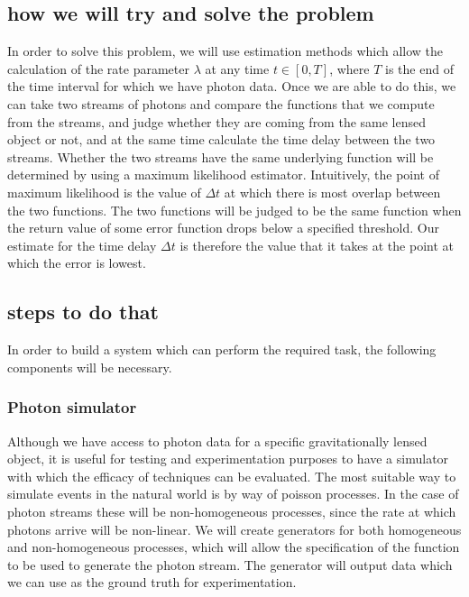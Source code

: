 \documentclass[11pt]{article}
\begin{document}
\subsection{how we will try and solve the problem}
\label{sec-2.3}

   In order to solve this problem, we will use estimation methods which allow the calculation of the rate parameter $\lambda$ at any time $t \in[0,T]$, where $T$ is the end of the time interval for which we have photon data. Once we are able to do this, we can take two streams of photons and compare the functions that we compute from the streams, and judge whether they are coming from the same lensed object or not, and at the same time calculate the time delay between the two streams. Whether the two streams have the same underlying function will be determined by using a maximum likelihood estimator. Intuitively, the point of maximum likelihood is the value of $\Delta t$ at which there is most overlap between the two functions. The two functions will be judged to be the same function when the return value of some error function drops below a specified threshold. Our estimate for the time delay $\Delta t$ is therefore the value that it takes at the point at which the error is lowest. 
\subsection{steps to do that}
\label{sec-2.4}

   In order to build a system which can perform the required task, the following components will be necessary.
   
\subsubsection{Photon simulator}
\label{sec-2.4.1}

    Although we have access to photon data for a specific gravitationally lensed object, it is useful for testing and experimentation purposes to have a simulator with which the efficacy of techniques can be evaluated. The most suitable way to simulate events in the natural world is by way of poisson processes. In the case of photon streams these will be non-homogeneous processes, since the rate at which photons arrive will be non-linear. We will create generators for both homogeneous and non-homogeneous processes, which will allow the specification of the function to be used to generate the photon stream. The generator will output data which we can use as the ground truth for experimentation.
\end{document}
